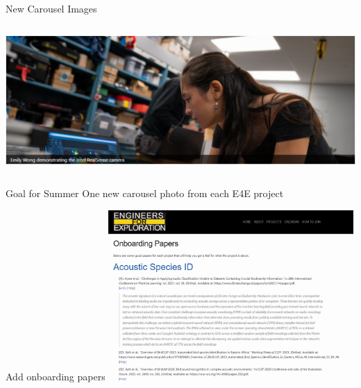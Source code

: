 \begin{frame}{New Carousel Images}
\begin{columns}
\begin{column}{0.33\textwidth}
            \includegraphics[width=\linewidth]{images/web_carousel_10.png}
        \end{column}
    \end{columns}
\end{frame}
\begin{frame}{Goal for Summer}
    One new carousel photo from each E4E project
\end{frame}

\begin{frame}{Add onboarding papers}
    \centering
    \includegraphics[height=0.7\textheight,width=0.7\textwidth,keepaspectratio]{images/onboarding.png}
\end{frame}

